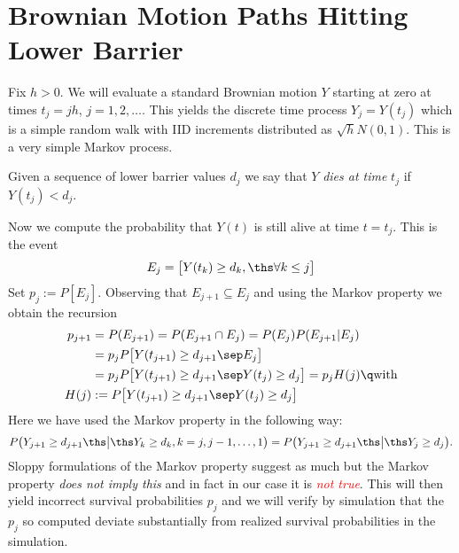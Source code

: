 \section{Brownian Motion Paths Hitting Lower Barrier}

Fix $h>0$. We will evaluate a standard Brownian motion $Y$ starting at zero at 
times $t_j=jh$, $j=1,2,\dots$. This yields the discrete time process $Y_j=Y(t_j)$ 
which is a simple random walk with IID increments distributed as $\sqrt{h}N(0,1)$.
This is a very simple Markov process.

Given a sequence of lower barrier values $d_j$ 
we say that $Y$ \textit{dies at time} $t_j$ if $Y(t_j)<d_j$.

Now we compute the probability that $Y(t)$ is still alive at time $t=t_j$. 
This is the event
$$
E_j=\big[Y(t_k)\geq d_k,\ths\forall k\leq j\big]
$$
Set $p_j:=P[E_j]$. Observing that $E_{j+1}\subseteq E_j$ and using the Markov property 
we obtain the recursion
%
\begin{align*}
p_{j+1} &= P(E_{j+1})=P(E_{j+1}\cap E_j)=P(E_j)P(E_{j+1}|E_j)\\&=
p_jP\big[Y(t_{j+1})\geq d_{j+1}\sep E_j\big]\\&=
p_jP\big[Y(t_{j+1})\geq d_{j+1}\sep Y(t_j)\geq d_j\big] = p_jH(j)
\q\text{with}\\
H(j) &:= P\big[Y(t_{j+1})\geq d_{j+1}\sep Y(t_j)\geq d_j\big]
\end{align*}
% 
Here we have used the Markov property in the following way:
%
\begin{equation}
\label{markov}
P\big(Y_{j+1}\geq d_{j+1}\ths\big|\ths Y_k\geq d_k, k=j,j-1,\dots,1\big) =
P\big(Y_{j+1}\geq d_{j+1}\ths\big|\ths Y_j\geq d_j\big).
\end{equation}
%
Sloppy formulations of the Markov property suggest as much but the Markov property 
\textit{does not imply this} and in fact in our case it is \textit{\textcolor{red}{not true}}.
This will then yield incorrect survival probabilities $p_j$ and we will verify by simulation
that the $p_j$ so computed deviate substantially from realized survival probabilities in the 
simulation.

